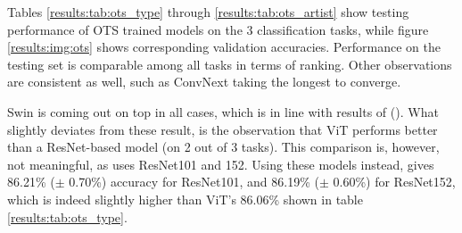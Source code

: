\begin{table}[]
\caption{Artist classification off the shelf}
\label{results:tab:ots_artist}
\end{table}


Tables \ref{results:tab:ots_type} through \ref{results:tab:ots_artist} show testing performance of OTS trained models on the 3 classification tasks, while figure \ref{results:img:ots} shows corresponding validation accuracies. Performance on the testing set is comparable among all tasks in terms of ranking. Other observations are consistent as well, such as ConvNext taking the longest to converge.

Swin is coming out on top in all cases, which is in line with results of \citeauthor{zhou2021convnets} (\citeyear{zhou2021convnets}). What slightly deviates from these result, is the observation that ViT performs better than a ResNet-based model (on 2 out of 3 tasks). This comparison is, however, not meaningful, as \citeauthor{zhou2021convnets} uses ResNet101 and 152. Using these models instead, gives 86.21\% ($\pm$ 0.70\%) accuracy for ResNet101, and 86.19\% ($\pm$ 0.60\%) for ResNet152, which is indeed slightly higher than ViT's 86.06\% shown in table \ref{results:tab:ots_type}.

